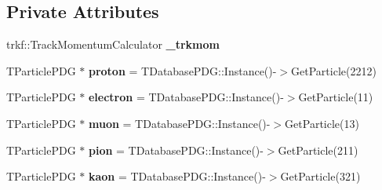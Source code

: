 \subsection*{Private Attributes}
\begin{DoxyCompactItemize}
\item 
\hypertarget{classselection_1_1CC0piNpSelection_a82c14d3fa8ea4b3edff07521b2f7c1b9}{trkf\-::\-Track\-Momentum\-Calculator {\bfseries \-\_\-trkmom}}\label{classselection_1_1CC0piNpSelection_a82c14d3fa8ea4b3edff07521b2f7c1b9}

\item 
\hypertarget{classselection_1_1CC0piNpSelection_a721706e2b68efe51225fa6388bc184d1}{T\-Particle\-P\-D\-G $\ast$ {\bfseries proton} = T\-Database\-P\-D\-G\-::\-Instance()-\/$>$Get\-Particle(2212)}\label{classselection_1_1CC0piNpSelection_a721706e2b68efe51225fa6388bc184d1}

\item 
\hypertarget{classselection_1_1CC0piNpSelection_ad04f8899cec1c9c54e720126e61a872f}{T\-Particle\-P\-D\-G $\ast$ {\bfseries electron} = T\-Database\-P\-D\-G\-::\-Instance()-\/$>$Get\-Particle(11)}\label{classselection_1_1CC0piNpSelection_ad04f8899cec1c9c54e720126e61a872f}

\item 
\hypertarget{classselection_1_1CC0piNpSelection_ae1161170f7b46e368ad608924cc412fd}{T\-Particle\-P\-D\-G $\ast$ {\bfseries muon} = T\-Database\-P\-D\-G\-::\-Instance()-\/$>$Get\-Particle(13)}\label{classselection_1_1CC0piNpSelection_ae1161170f7b46e368ad608924cc412fd}

\item 
\hypertarget{classselection_1_1CC0piNpSelection_a7237863b296cd8e3bf68dccb4d4122bb}{T\-Particle\-P\-D\-G $\ast$ {\bfseries pion} = T\-Database\-P\-D\-G\-::\-Instance()-\/$>$Get\-Particle(211)}\label{classselection_1_1CC0piNpSelection_a7237863b296cd8e3bf68dccb4d4122bb}

\item 
\hypertarget{classselection_1_1CC0piNpSelection_a1881dd29c46973578cb8b48a726f34f0}{T\-Particle\-P\-D\-G $\ast$ {\bfseries kaon} = T\-Database\-P\-D\-G\-::\-Instance()-\/$>$Get\-Particle(321)}\label{classselection_1_1CC0piNpSelection_a1881dd29c46973578cb8b48a726f34f0}


\end{DoxyCompactItemize}
